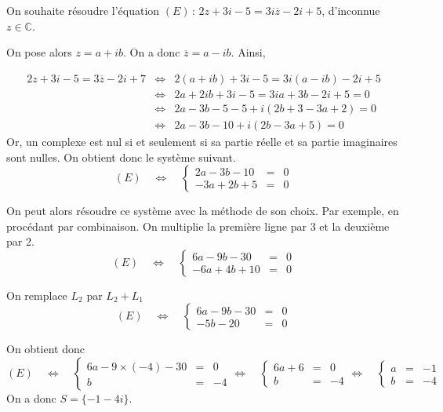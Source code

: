 \documentclass[11pt,fleqn, openany]{book} %
\begin{document}
\begin{example}On souhaite résoudre l'équation $(E) \,: \,2z + 3i -5 = 3i\overline{z}-2i+5$, d'inconnue $z \in \mathbb{C}$.

On pose alors $z=a+ib$. On a donc $\overline{z}=a-ib$. Ainsi,

\begin{eqnarray*}
2z + 3i -5 = 3\overline{z}-2i+7 & \Leftrightarrow & 2(a+ib)+3i-5=3i(a-ib)-2i+5 \\
& \Leftrightarrow & 2a+2ib+3i-5=3ia+3b-2i+5=0 \\
& \Leftrightarrow & 2a-3b-5-5 +i(2b+3-3a+2)=0 \\
& \Leftrightarrow & 2a -3b-10 + i (2b-3a+5)=0
\end{eqnarray*}
Or, un complexe est nul si et seulement si sa partie réelle et sa partie imaginaires sont nulles. On obtient donc le système suivant.
\[(E) \quad \Leftrightarrow \quad \left\{\begin{array}{rcl}
2a -3b-10 &=& 0\\
-3a+2b+5 &=& 0
\end{array}\right.\]

On peut alors résoudre ce système avec la méthode de son choix. Par exemple, en procédant par combinaison. On multiplie la première ligne par 3 et la deuxième par 2.
\[(E) \quad \Leftrightarrow \quad\left\{\begin{array}{rcl}
6a -9b-30 &=& 0\\
-6a+4b+10 &=& 0
\end{array}\right.\]

On remplace $L_2$ par $L_2+L_1$
\[(E) \quad \Leftrightarrow \quad\left\{\begin{array}{rcl}
6a -9b-30 &=& 0\\
-5b-20 &=& 0
\end{array}\right.\]

On obtient donc
\[(E) \quad \Leftrightarrow \quad\left\{\begin{array}{rcl}
6a -9\times (-4)-30 &=& 0\\
b &=& -4
\end{array}\right. \Leftrightarrow \quad\left\{\begin{array}{rcl}
6a +6 &=& 0\\
b &=& -4
\end{array}\right.  \Leftrightarrow \quad\left\{\begin{array}{rcl}
a &=& -1\\
b &=& -4
\end{array}\right.\]
On a donc $S=\{ -1-4i\}$.
\end{example}
\end{document}
